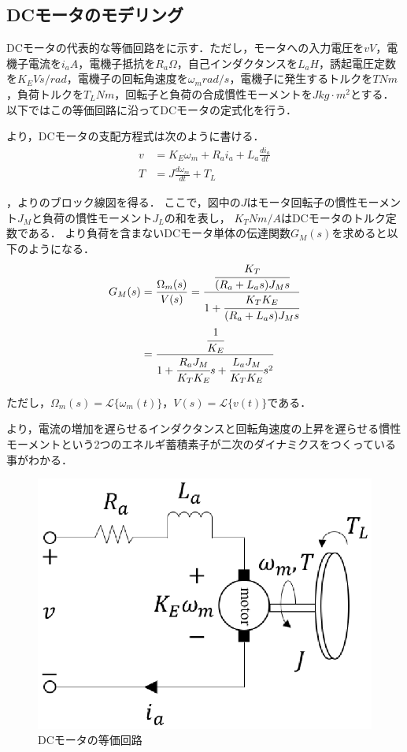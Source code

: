 \subsection{DCモータのモデリング}
DCモータの代表的な等価回路をに示す．\cite{dcmmodeling}ただし，モータへの入力電圧を$v\unit{V}$，電機子電流を$i_{a}\unit{A}$，電機子抵抗を$R_{a}\unit{\Omega}$，自己インダクタンスを$L_{a}\unit{H}$，誘起電圧定数を$K_{E}\unit{Vs/rad}$，電機子の回転角速度を$\omega_{m}\unit{rad/s}$，電機子に発生するトルクを$T\unit{Nm}$，負荷トルクを$T_L\unit{Nm}$，回転子と負荷の合成慣性モーメントを$J\unit{kg\cdot m^2}$とする．以下ではこの等価回路に沿ってDCモータの定式化を行う．

より，DCモータの支配方程式は次のように書ける．
\begin{align}
v &= K_{E}\omega_{m} + R_{a}i_{a} + L_{a}\frac{di_{a}}{dt} \label{eq::dcm_v} \\
T &= J\frac{d\omega_{m}}{dt} + T_{L} \label{eq::dcm_t}
\end{align}

，よりのブロック線図を得る．
ここで，図中の$J$はモータ回転子の慣性モーメント$J_{M}$と負荷の慣性モーメント$J_{L}$の和を表し，
$K_{T}\unit{Nm/A}$はDCモータのトルク定数である．
より負荷を含まないDCモータ単体の伝達関数$G_{M}(s)$を求めると以下のようになる．
\begin{align}
G_{M}(s) &= \frac{\Omega_{m}(s)}{V(s)} = 
\frac{\cfrac{K_{T}}{(R_{a} + L_{a}s)J_{M}s}}{1 + \cfrac{K_{T}K_{E}}{(R_{a} + L_{a}s)J_{M}s}} \nonumber \\
 &= \frac{\cfrac{1}{K_{E}}}{1 + \cfrac{R_{a}J_{M}}{K_{T}K_{E}}s + \cfrac{L_{a}J_{M}}{K_{T}K_{E}}s^2} \label{eq::dcm_tf}
\end{align}

ただし，$\Omega_{m}(s) = \mathcal{L}\{\omega_{m}(t)\}，V(s) = \mathcal{L}\{v(t)\}$である．

より，電流の増加を遅らせるインダクタンスと回転角速度の上昇を遅らせる慣性モーメントという2つのエネルギ蓄積素子が二次のダイナミクスをつくっている事がわかる．

\begin{figure}[htb]
  \centering
    \includegraphics[width=0.5\hsize]{picture/eps/dcm_circit.eps}
    \caption{DCモータの等価回路}
    \label{fig::dcm_circit}
\end{figure}

